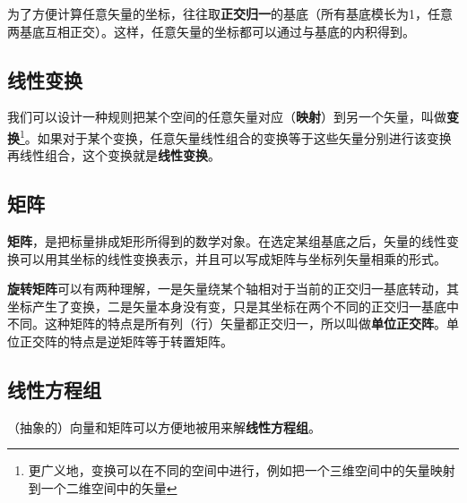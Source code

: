 为了方便计算任意矢量的坐标，往往取\textbf{正交归一}的基底（所有基底模长为1，任意两基底互相正交）。这样，任意矢量的坐标都可以通过与基底的内积得到。

\subsection{线性变换}

我们可以设计一种规则把某个空间的任意矢量对应（\textbf{映射}）到另一个矢量，叫做\textbf{变换}\footnote{更广义地，变换可以在不同的空间中进行，例如把一个三维空间中的矢量映射到一个二维空间中的矢量}。如果对于某个变换，任意矢量线性组合的变换等于这些矢量分别进行该变换再线性组合，这个变换就是\textbf{线性变换}。

\subsection{矩阵}

\textbf{矩阵}，是把标量排成矩形所得到的数学对象。在选定某组基底之后，矢量的线性变换可以用其坐标的线性变换表示，并且可以写成矩阵与坐标列矢量相乘的形式。


\textbf{旋转矩阵}可以有两种理解，一是矢量绕某个轴相对于当前的正交归一基底转动，其坐标产生了变换，二是矢量本身没有变，只是其坐标在两个不同的正交归一基底中不同。这种矩阵的特点是所有列（行）矢量都正交归一，所以叫做\textbf{单位正交阵}。单位正交阵的特点是逆矩阵等于转置矩阵。






\subsection{线性方程组}

（抽象的）向量和矩阵可以方便地被用来解\textbf{线性方程组}。
